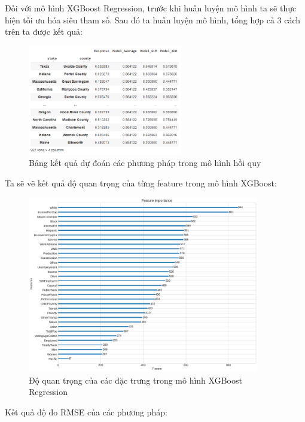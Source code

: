 \documentclass[14pt, a4paper]{article}
\numberwithin{equation}{section}
\numberwithin{figure}{section}
\numberwithin{dl}{section}
\numberwithin{md}{section}
\numberwithin{bd}{section}
\numberwithin{dn}{section}
\numberwithin{hq}{section}
\begin{document}
    Đối với mô hình XGBoost Regression, trước khi huấn luyện mô hình ta sẽ thực hiện tối ưu hóa siêu tham số.
    Sau đó ta huấn luyện mô hình, tổng hợp cả 3 cách trên ta được kết quả:

    \begin{figure}[h!]
        \centering
        \includegraphics[width=0.6\textwidth]{figures/Regression_Model_Result.png}
        \caption{Bảng kết quả dự đoán các phương pháp trong mô hình hồi quy}
    \end{figure}

    Ta sẽ vẽ kết quả độ quan trọng của từng feature trong mô hình XGBoost:

    \begin{figure}[h!]
        \centering
        \includegraphics[width=0.9\textwidth]{figures/XGBoost_Regression_Feature_Importance.png}
        \caption{Độ quan trọng của các đặc trưng trong mô hình XGBoost Regression}
    \end{figure}
    
    Kết quả độ đo RMSE của các phương pháp:
\end{document}
